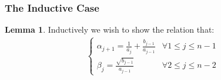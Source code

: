 \documentclass[]{article}
\theoremstyle{definition}
\newtheorem{lemma}{Lemma}[subsection]  %
\begin{document}
        \subsubsection{The Inductive Case}
            \begin{lemma}
                Inductively we wish to show the relation that: 
                \begin{align}
                    \begin{cases}
                        \alpha_{j + 1} = \frac{1}{a_j} + \frac{b_{j - 1}}{a_{j - 1}}
                        & \forall 1 \le j \le n - 1
                        \\
                        \beta_{j} = \frac{\sqrt{b_{j - 1}}}{a_{j - 1}}
                        & \forall 2 \le j \le n - 2 
                    \end{cases}
                \end{align}
            \end{lemma}
\end{document}

